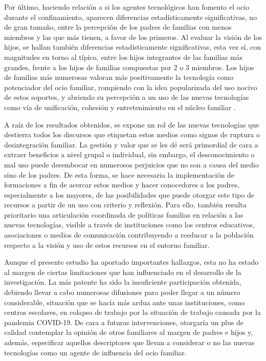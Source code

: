 \documentclass[spanish]{textolivre}
\begin{document}
Por último, haciendo relación a si los agentes tecnológicos han fomento el ocio durante el confinamiento, aparecen diferencias estadísticamente significativas, no de gran tamaño, entre la percepción de los padres de familias con menos miembros y las que más tienen, a favor de los primeros. Al evaluar la visión de los hijos, se hallan también diferencias estadísticamente significativas, esta vez sí, con magnitudes en torno al típico, entre los hijos integrantes de las familias más grandes, frente a los hijos de familias compuestas por 2 o 3 miembros. Los hijos de familias más numerosas valoran más positivamente la tecnología como potenciador del ocio familiar, rompiendo con la idea popularizada del uso nocivo de estos soportes, y abriendo su percepción a un uso de las nuevas tecnologías como vía de unificación, cohesión y entretenimiento en el núcleo familiar \cite{doss2017}. 

A raíz de los resultados obtenidos, se expone un rol de las nuevas tecnologías que destierra todos los discursos que etiquetan estos medios como signos de ruptura o desintegración familiar. La gestión y valor que se les dé será primordial de cara a extraer beneficios a nivel grupal o individual, sin embargo, el desconocimiento o mal uso puede desembocar en numerosos perjuicios que no son a causa del medio sino de los padres. De esta forma, se hace necesaria la implementación de formaciones a fin de acercar estos medios y hacer conocedores a los padres, especialmente a los mayores, de las posibilidades que puede otorgar este tipo de recursos a partir de un uso con criterio y reflexión. Para ello, también resulta prioritario una articulación coordinada de políticas familias en relación a las nuevas tecnologías, visible a través de instituciones como los centros educativos, asociaciones o medios de comunicación contribuyendo a reeducar a la población respecto a la visión y uso de estos recursos en el entorno familiar. 

Aunque el presente estudio ha aportado importantes hallazgos, esta no ha estado al margen de ciertas limitaciones que han influenciado en el desarrollo de la investigación. La más patente ha sido la insuficiente participación obtenida, debiendo llevar a cabo numerosas difusiones para poder llegar a un número considerable, situación que se hacía más ardua ante unas instituciones, como centros escolares, en colapso de trabajo por la situación de trabajo causada por la pandemia COVID-19. De cara a futuras intervenciones, otorgaría un plus de calidad contemplar la opinión de otros familiares al margen de padres e hijos y, además, especificar aquellos descriptores que llevan a considerar o no las nuevas tecnologías como un agente de influencia del ocio familiar. 





\printbibliography\label{sec-bib}
\end{document}
